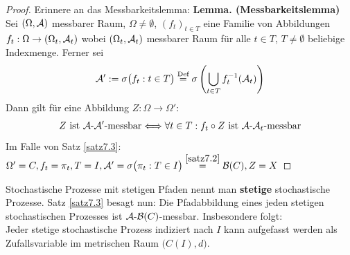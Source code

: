 \begin{proof}
	Erinnere an das Messbarkeitslemma:\nl
	\textbf{Lemma. (Messbarkeitslemma)}\\
	Sei $(\Omega,\mathcal{A})$ messbarer Raum, $\Omega\neq\emptyset$, $(f_t)_{t\in T}$ eine Familie von Abbildungen\\ $f_t:\Omega\to(\Omega_t,\mathcal{A}_t)$ wobei $(\Omega_t,\mathcal{A}_t)$ messbarer Raum für alle $t\in T$, $T\neq\emptyset$ beliebige Indexmenge. 
	Ferner sei
	\begin{align*}
		\mathcal{A}':=\sigma\big(f_t:t\in T\big)\overset{\text{Def}}{=}\sigma\left(\bigcup\limits_{t\in T} f_t^{-1}(\mathcal{A}_t)\right)
	\end{align*}
	Dann gilt für eine Abbildung $Z:\Omega\to\Omega'$:
	\begin{align*}
		Z\text{ ist }\mathcal{A}\text{-}\mathcal{A}'\text{-messbar}\Longleftrightarrow\forall t\in T: f_t\circ Z\text{ ist }\mathcal{A}\text{-}\mathcal{A}_t\text{-messbar}
	\end{align*}
	Im Falle von Satz \ref{satz7.3}: $\Omega'=C, f_t=\pi_t, T=I,\mathcal{A}'=\sigma\big(\pi_t:T\in I\big)\overset{\ref{satz7.2}}{=}\mathcal{B}(C),Z=X$
\end{proof}

Stochastische Prozesse mit stetigen Pfaden nennt man \textbf{stetige} stochastische Prozesse. 
Satz \ref{satz7.3} besagt nun: 
Die Pfadabbildung eines jeden stetigen stochastischen Prozesses ist $\mathcal{A}\text{-}\mathcal{B}(C)$-messbar. 
Insbesondere folgt:\\
Jeder stetige stochastische Prozess indiziert nach $I$ kann aufgefasst werden als Zufallsvariable im metrischen Raum $\big(C(I),d\big)$.

